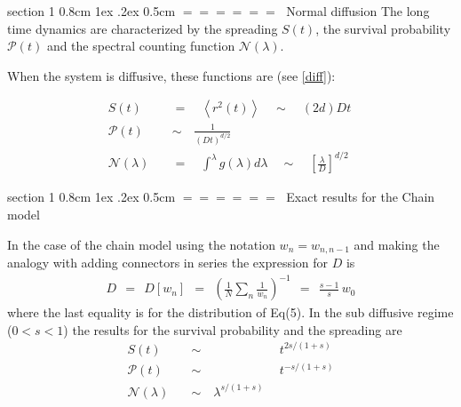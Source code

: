 \documentclass[onecolumn,fleqn,notitlepage,secnumarabic]{revtex4}
\makeatletter
\newcommand{\beq}{\begin{eqnarray}}
\newcommand{\eeq}{\end{eqnarray}}
\def\section{%
  \@startsection
    {section}%
    {1}%
    {\z@}%
    {0.8cm \@plus1ex \@minus .2ex}%
    {0.5cm}%
    {\Large\bf $=\!=\!=\!=\!=\!=\;$}%
}%
\makeatother
\begin{document}

\clearpage


\section{Normal diffusion}
The long time dynamics are characterized by the spreading $S(t)$, the survival probability $\mathcal{P}(t)$ and the spectral counting function $\mathcal{N}(\lambda)$. 

When the system is diffusive, these functions are (see \ref{diff}):

\begin{align*}
S(t) \quad&=\quad \left\langle r^2(t)\right\rangle \quad\sim\quad  (2d)Dt\ \\
\mathcal{P}(t) \quad &\sim \quad  \frac{1}{\left({D t}\right)^{d/2}} \\
\mathcal{N}(\lambda)  \quad&=\quad \int^\lambda g(\lambda)d\lambda  \quad\sim\quad \left[\frac{\lambda}{D}\right]^{d/2} 
\end{align*}



\section{Exact results for the Chain model}

In the case of the chain model
using the notation $w_n=w_{n,n{-}1}$ 
and making the analogy with adding connectors in series 
the expression for $D$ is 
%
\beq
D \ \ = \ \ D[w_n] \ \ = \ \ \left( \frac{1}{N} \sum_n \frac{1}{w_n} \right)^{-1} 
\ \ = \ \ \frac{s-1}{s} \, w_0
\eeq
%
where the last equality is for the distribution of Eq(5).
In the sub diffusive regime (${0<s<1}$) the results 
for the survival probability and the spreading are 
%
\beq
S(t) \ \ &\sim& \ \ t^{2s/(1+s)}   \\ 
\mathcal{P}(t) \ \ &\sim& \ \ t^{-s/(1+s)}\\
\mathcal{N}(\lambda) \quad &\sim \quad \lambda^{s/(1+s)}
\eeq
\end{document}
